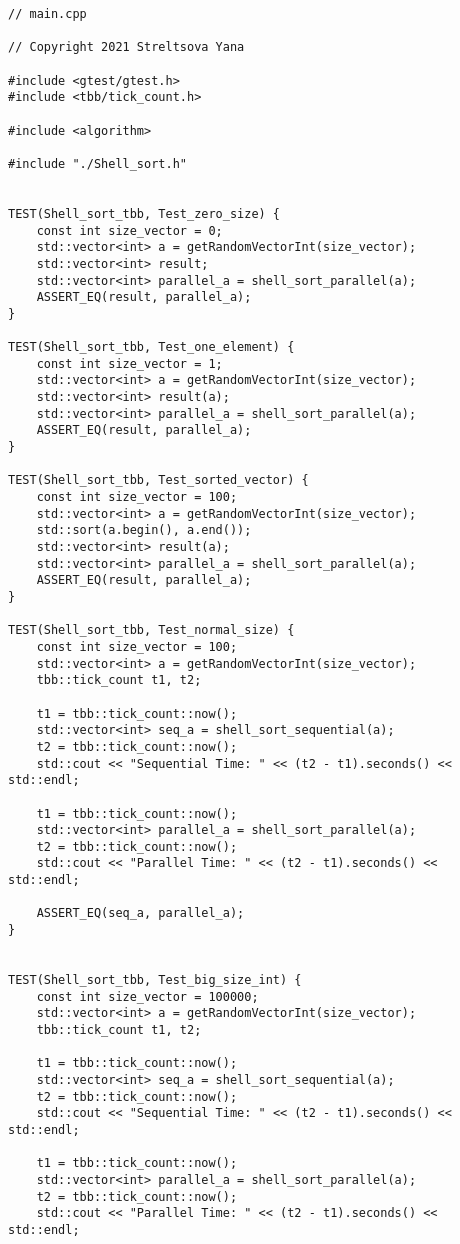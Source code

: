 \documentclass{report}
\begin{document}
\begin{lstlisting}
// main.cpp

// Copyright 2021 Streltsova Yana

#include <gtest/gtest.h>
#include <tbb/tick_count.h>

#include <algorithm>

#include "./Shell_sort.h"


TEST(Shell_sort_tbb, Test_zero_size) {
    const int size_vector = 0;
    std::vector<int> a = getRandomVectorInt(size_vector);
    std::vector<int> result;
    std::vector<int> parallel_a = shell_sort_parallel(a);
    ASSERT_EQ(result, parallel_a);
}

TEST(Shell_sort_tbb, Test_one_element) {
    const int size_vector = 1;
    std::vector<int> a = getRandomVectorInt(size_vector);
    std::vector<int> result(a);
    std::vector<int> parallel_a = shell_sort_parallel(a);
    ASSERT_EQ(result, parallel_a);
}

TEST(Shell_sort_tbb, Test_sorted_vector) {
    const int size_vector = 100;
    std::vector<int> a = getRandomVectorInt(size_vector);
    std::sort(a.begin(), a.end());
    std::vector<int> result(a);
    std::vector<int> parallel_a = shell_sort_parallel(a);
    ASSERT_EQ(result, parallel_a);
}

TEST(Shell_sort_tbb, Test_normal_size) {
    const int size_vector = 100;
    std::vector<int> a = getRandomVectorInt(size_vector);
    tbb::tick_count t1, t2;

    t1 = tbb::tick_count::now();
    std::vector<int> seq_a = shell_sort_sequential(a);
    t2 = tbb::tick_count::now();
    std::cout << "Sequential Time: " << (t2 - t1).seconds() << std::endl;

    t1 = tbb::tick_count::now();
    std::vector<int> parallel_a = shell_sort_parallel(a);
    t2 = tbb::tick_count::now();
    std::cout << "Parallel Time: " << (t2 - t1).seconds() << std::endl;

    ASSERT_EQ(seq_a, parallel_a);
}


TEST(Shell_sort_tbb, Test_big_size_int) {
    const int size_vector = 100000;
    std::vector<int> a = getRandomVectorInt(size_vector);
    tbb::tick_count t1, t2;

    t1 = tbb::tick_count::now();
    std::vector<int> seq_a = shell_sort_sequential(a);
    t2 = tbb::tick_count::now();
    std::cout << "Sequential Time: " << (t2 - t1).seconds() << std::endl;

    t1 = tbb::tick_count::now();
    std::vector<int> parallel_a = shell_sort_parallel(a);
    t2 = tbb::tick_count::now();
    std::cout << "Parallel Time: " << (t2 - t1).seconds() << std::endl;


\end{lstlisting}
\end{document}
